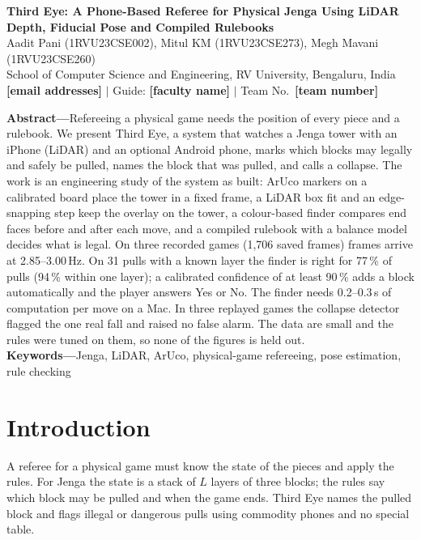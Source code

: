 \documentclass[12pt,a4paper]{article}
\newcommand{\tbd}[1]{\textbf{[#1]}}
\begin{document}
\begin{center}
{\bfseries\Large Third Eye: A Phone-Based Referee for Physical Jenga Using LiDAR Depth, Fiducial Pose and Compiled Rulebooks}\\[4pt]
\singlespacing
Aadit Pani (1RVU23CSE002), Mitul KM (1RVU23CSE273), Megh Mavani (1RVU23CSE260)\\
School of Computer Science and Engineering, RV University, Bengaluru, India\\
\tbd{email addresses} $|$ Guide: \tbd{faculty name} $|$ Team No.\ \tbd{team number}
\end{center}
\onehalfspacing

\noindent\textbf{Abstract---}Refereeing a physical game needs the position of every piece and a rulebook. We present Third Eye, a system that watches a Jenga tower with an iPhone (LiDAR) and an optional Android phone, marks which blocks may legally and safely be pulled, names the block that was pulled, and calls a collapse. The work is an engineering study of the system as built: ArUco markers on a calibrated board place the tower in a fixed frame, a LiDAR box fit and an edge-snapping step keep the overlay on the tower, a colour-based finder compares end faces before and after each move, and a compiled rulebook with a balance model decides what is legal. On three recorded games (1{,}706 saved frames) frames arrive at 2.85--3.00\,Hz. On 31 pulls with a known layer the finder is right for 77\,\% of pulls (94\,\% within one layer); a calibrated confidence of at least 90\,\% adds a block automatically and the player answers Yes or No. The finder needs 0.2--0.3\,s of computation per move on a Mac. In three replayed games the collapse detector flagged the one real fall and raised no false alarm. The data are small and the rules were tuned on them, so none of the figures is held out.\\[2pt]
\noindent\textbf{Keywords---}Jenga, LiDAR, ArUco, physical-game refereeing, pose estimation, rule checking

\section{Introduction}
A referee for a physical game must know the state of the pieces and apply the rules. For Jenga the state is a stack of $L$ layers of three blocks; the rules say which block may be pulled and when the game ends. Third Eye names the pulled block and flags illegal or dangerous pulls using commodity phones and no special table.
\end{document}
